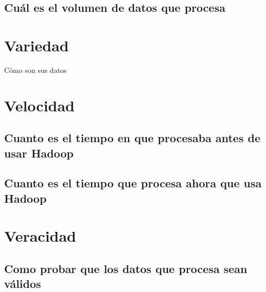 \subsection{Cuál es el volumen de datos que procesa}
\lipsum[1] %


\clearpage
\section{Variedad}
Cómo son sus datos
\lipsum[1] %

\clearpage
\section{Velocidad}

\subsection{Cuanto es el tiempo en que procesaba antes de usar Hadoop}
\lipsum[1] %

\subsection{Cuanto es el tiempo que procesa ahora que usa Hadoop}

\clearpage
\section{Veracidad}

\subsection{Como probar que los datos que procesa sean válidos}
\lipsum[1] %


